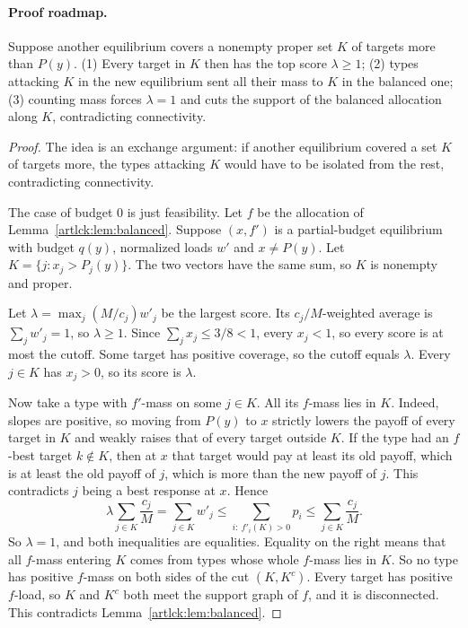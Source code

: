 \paragraph{Proof roadmap.} Suppose another equilibrium covers a nonempty proper set $K$ of targets more
than $P(y)$. (1) Every target in $K$ then has the top score $\lambda\ge1$; (2) types attacking $K$ in the
new equilibrium sent all their mass to $K$ in the balanced one; (3) counting mass forces $\lambda=1$ and
cuts the support of the balanced allocation along $K$, contradicting connectivity.

\begin{proof}
The idea is an exchange argument: if another equilibrium covered a set $K$ of targets more, the types
attacking $K$ would have to be isolated from the rest, contradicting connectivity.

The case of budget $0$ is just feasibility. Let $f$ be the allocation of Lemma~\ref{artlck:lem:balanced}.
Suppose $(x,f')$ is a partial-budget equilibrium with budget $q(y)$, normalized loads $w'$ and
$x\ne P(y)$. Let $K=\{j:x_j>P_j(y)\}$. The two vectors have the same sum, so $K$ is nonempty and proper.

Let $\lambda=\max_j(M/c_j)w'_j$ be the largest score. Its $c_j/M$-weighted average is $\sum_jw'_j=1$, so
$\lambda\ge1$. Since $\sum_jx_j\le3/8<1$, every $x_j<1$, so every score is at most the cutoff. Some target
has positive coverage, so the cutoff equals $\lambda$. Every $j\in K$ has $x_j>0$, so its score is
$\lambda$.

Now take a type with $f'$-mass on some $j\in K$. All its $f$-mass lies in $K$. Indeed, slopes are
positive, so moving from $P(y)$ to $x$ strictly lowers the payoff of every target in $K$ and weakly raises
that of every target outside $K$. If the type had an $f$-best target $k\notin K$, then at $x$ that target
would pay at least its old payoff, which is at least the old payoff of $j$, which is more than the new
payoff of $j$. This contradicts $j$ being a best response at $x$. Hence
\[
 \lambda\sum_{j\in K}\frac{c_j}{M}=\sum_{j\in K}w'_j\le\sum_{i:\ f'_i(K)>0}p_i\le\sum_{j\in K}\frac{c_j}{M}.
\]
So $\lambda=1$, and both inequalities are equalities. Equality on the right means that all $f$-mass
entering $K$ comes from types whose whole $f$-mass lies in $K$. So no type has positive $f$-mass on both
sides of the cut $(K,K^c)$. Every target has positive $f$-load, so $K$ and $K^c$ both meet the support
graph of $f$, and it is disconnected. This contradicts Lemma~\ref{artlck:lem:balanced}.
\end{proof}

